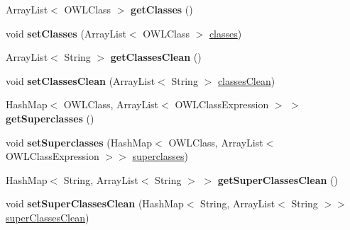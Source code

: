 \begin{DoxyCompactItemize}
\item 
\hypertarget{class_ontology_1_1_ontology_a02dbe350e5c6c59c8a27dff7f3a643d7}{
ArrayList$<$ OWLClass $>$ {\bfseries getClasses} ()}
\label{class_ontology_1_1_ontology_a02dbe350e5c6c59c8a27dff7f3a643d7}

\item 
\hypertarget{class_ontology_1_1_ontology_ab9d088ebcfd87b648bacd0053f402158}{
void {\bfseries setClasses} (ArrayList$<$ OWLClass $>$ \hyperlink{class_ontology_1_1_ontology_a60484a66d42244f83c944d7fd7f67fcf}{classes})}
\label{class_ontology_1_1_ontology_ab9d088ebcfd87b648bacd0053f402158}

\item 
\hypertarget{class_ontology_1_1_ontology_a1cad18775a94610a7c563dfcdbfe7ab5}{
ArrayList$<$ String $>$ {\bfseries getClassesClean} ()}
\label{class_ontology_1_1_ontology_a1cad18775a94610a7c563dfcdbfe7ab5}

\item 
\hypertarget{class_ontology_1_1_ontology_ab2984f2e5d7012029fd6d98d1447433a}{
void {\bfseries setClassesClean} (ArrayList$<$ String $>$ \hyperlink{class_ontology_1_1_ontology_a35b7af950c4bd1f698fcf18cb38f4e02}{classesClean})}
\label{class_ontology_1_1_ontology_ab2984f2e5d7012029fd6d98d1447433a}

\item 
\hypertarget{class_ontology_1_1_ontology_a1e791e04e11967cadc062b5c23344980}{
HashMap$<$ OWLClass, ArrayList$<$ OWLClassExpression $>$ $>$ {\bfseries getSuperclasses} ()}
\label{class_ontology_1_1_ontology_a1e791e04e11967cadc062b5c23344980}

\item 
\hypertarget{class_ontology_1_1_ontology_a54171d4f7b19e9743391140af5a328af}{
void {\bfseries setSuperclasses} (HashMap$<$ OWLClass, ArrayList$<$ OWLClassExpression $>$$>$ \hyperlink{class_ontology_1_1_ontology_a0a5224da294ff4af352081031305f799}{superclasses})}
\label{class_ontology_1_1_ontology_a54171d4f7b19e9743391140af5a328af}

\item 
\hypertarget{class_ontology_1_1_ontology_a351af5bb1b50f3c68f9ea90b05e035a5}{
HashMap$<$ String, ArrayList$<$ String $>$ $>$ {\bfseries getSuperClassesClean} ()}
\label{class_ontology_1_1_ontology_a351af5bb1b50f3c68f9ea90b05e035a5}

\item 
\hypertarget{class_ontology_1_1_ontology_a5049c446369c5eeae5ddf4bf50b91c70}{
void {\bfseries setSuperClassesClean} (HashMap$<$ String, ArrayList$<$ String $>$$>$ \hyperlink{class_ontology_1_1_ontology_a08165d8cd889ef937321671134aae060}{superClassesClean})}
\label{class_ontology_1_1_ontology_a5049c446369c5eeae5ddf4bf50b91c70}


\end{DoxyCompactItemize}
